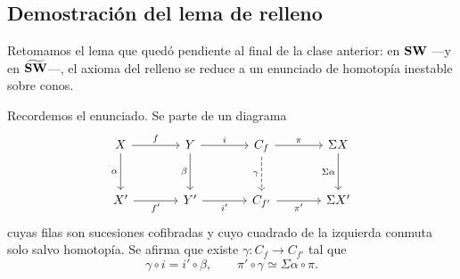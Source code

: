 \subsection{Demostración del lema de relleno}

Retomamos el lema que quedó pendiente al final de la clase anterior: en $\mathbf{SW}$ ---y en $\widetilde{\mathbf{SW}}$---, el axioma del relleno se reduce a un enunciado de homotopía inestable sobre conos.

Recordemos el enunciado. Se parte de un diagrama
\[
\begin{tikzcd}[column sep=large, row sep=large]
X \arrow[r,"f"] \arrow[d,"\alpha"'] & Y \arrow[r,"i"] \arrow[d,"\beta"'] & C_f \arrow[r,"\pi"] \arrow[d,dashed,"\gamma"'] & \Sigma X \arrow[d,"\Sigma\alpha"']\\
X' \arrow[r,"f'"'] & Y' \arrow[r,"i'"'] & C_{f'} \arrow[r,"\pi'"'] & \Sigma X'
\end{tikzcd}
\]
cuyas filas son sucesiones cofibradas y cuyo cuadrado de la izquierda conmuta solo salvo homotopía. Se afirma que existe $\gamma\colon C_f\to C_{f'}$ tal que
\[
\gamma\circ i=i'\circ\beta,
\qquad
\pi'\circ\gamma\simeq\Sigma\alpha\circ\pi .
\]

